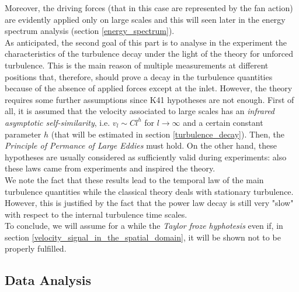 \documentclass[11pt,titlepage]{article}
\begin{document}
Moreover, the driving forces (that in this case are represented by the fan action) are evidently applied only on large scales and this will seen later in the energy spectrum analysis (section \ref{energy_spectrum}). \\
As anticipated, the second goal of this part is to analyse in the experiment the characteristics of the turbulence decay under the light of the theory for unforced turbulence. This is the main reason of multiple measurements at different positions that, therefore, should prove a decay in the turbulence quantities because of the absence of applied forces except at the inlet. However, the theory requires some further assumptions since K41 hypotheses are not enough. First of all, it is assumed that the velocity associated to large scales has an \emph{infrared asymptotic self-similarity}, i.e. $v_l \sim Cl^h$ for $l \rightarrow \infty$ and a certain constant parameter $h$ (that will be estimated in section \ref{turbulence_decay}). Then, the \emph{Principle of Permance of Large Eddies} must hold. On the other hand, these hypotheses are usually considered as sufficiently valid during experiments: also these laws came from experiments and inspired the theory.\\
We note the fact that these results lead to the temporal law of the main turbulence quantities while the classical theory deals with stationary turbulence. However, this is justified by the fact that the power law decay is still very "slow" with respect to the internal turbulence time scales. \\
To conclude, we will assume for a while the \emph{Taylor froze hyphotesis} even if, in section \ref{velocity_signal_in_the_spatial_domain}, it will be shown not to be properly fulfilled.


\subsection{Data Analysis}
\end{document}

